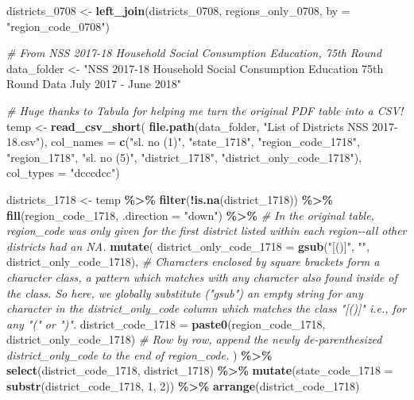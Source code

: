 \documentclass[
]{article}
\newenvironment{Shaded}{\begin{snugshade}}{\end{snugshade}}
\newcommand{\AttributeTok}[1]{\textcolor[rgb]{0.13,0.29,0.53}{#1}}
\newcommand{\CommentTok}[1]{\textcolor[rgb]{0.56,0.35,0.01}{\textit{#1}}}
\newcommand{\DecValTok}[1]{\textcolor[rgb]{0.00,0.00,0.81}{#1}}
\newcommand{\FunctionTok}[1]{\textcolor[rgb]{0.13,0.29,0.53}{\textbf{#1}}}
\newcommand{\NormalTok}[1]{#1}
\newcommand{\OtherTok}[1]{\textcolor[rgb]{0.56,0.35,0.01}{#1}}
\newcommand{\SpecialCharTok}[1]{\textcolor[rgb]{0.81,0.36,0.00}{\textbf{#1}}}
\newcommand{\StringTok}[1]{\textcolor[rgb]{0.31,0.60,0.02}{#1}}
\begin{document}
\begin{Shaded}
\begin{Highlighting}[]
\NormalTok{districts\_0708 }\OtherTok{\textless{}{-}} \FunctionTok{left\_join}\NormalTok{(districts\_0708, regions\_only\_0708, }\AttributeTok{by =} \StringTok{"region\_code\_0708"}\NormalTok{)}





\CommentTok{\# From NSS 2017{-}18 Household Social Consumption Education, 75th Round}
\NormalTok{data\_folder }\OtherTok{\textless{}{-}} \StringTok{"NSS 2017{-}18 Household Social Consumption Education 75th Round Data July 2017 {-} June 2018"}

\CommentTok{\# Huge thanks to Tabula for helping me turn the original PDF table into a CSV!}
\NormalTok{temp }\OtherTok{\textless{}{-}} \FunctionTok{read\_csv\_short}\NormalTok{(}
  \FunctionTok{file.path}\NormalTok{(data\_folder, }\StringTok{"List of Districts NSS 2017{-}18.csv"}\NormalTok{),}
  \AttributeTok{col\_names =} \FunctionTok{c}\NormalTok{(}\StringTok{"sl. no (1)"}\NormalTok{, }\StringTok{"state\_1718"}\NormalTok{, }\StringTok{"region\_code\_1718"}\NormalTok{, }\StringTok{"region\_1718"}\NormalTok{, }\StringTok{"sl. no (5)"}\NormalTok{, }\StringTok{"district\_1718"}\NormalTok{, }\StringTok{"district\_only\_code\_1718"}\NormalTok{),}
  \AttributeTok{col\_types =} \StringTok{"dcccdcc"}\NormalTok{)}

\NormalTok{districts\_1718 }\OtherTok{\textless{}{-}}\NormalTok{ temp }\SpecialCharTok{\%\textgreater{}\%} 
  \FunctionTok{filter}\NormalTok{(}\SpecialCharTok{!}\FunctionTok{is.na}\NormalTok{(district\_1718)) }\SpecialCharTok{\%\textgreater{}\%} 
  \FunctionTok{fill}\NormalTok{(region\_code\_1718, }\AttributeTok{.direction =} \StringTok{"down"}\NormalTok{) }\SpecialCharTok{\%\textgreater{}\%} \CommentTok{\# In the original table, region\_code was only given for the first district listed within each region{-}{-}all other districts had an NA.}
  \FunctionTok{mutate}\NormalTok{(}
    \AttributeTok{district\_only\_code\_1718 =} \FunctionTok{gsub}\NormalTok{(}\StringTok{"[()]"}\NormalTok{, }\StringTok{""}\NormalTok{, district\_only\_code\_1718), }\CommentTok{\# Characters enclosed by square brackets form a character class, a pattern which matches with any character also found inside of the class. So here, we globally substitute ("gsub") an empty string for any character in the district\_only\_code column which matches the class "[()]" i.e., for any "(" or ")".}
    \AttributeTok{district\_code\_1718 =} \FunctionTok{paste0}\NormalTok{(region\_code\_1718, district\_only\_code\_1718) }\CommentTok{\# Row by row, append the newly de{-}parenthesized district\_only\_code to the end of region\_code.}
\NormalTok{  ) }\SpecialCharTok{\%\textgreater{}\%} 
  \FunctionTok{select}\NormalTok{(district\_code\_1718, district\_1718) }\SpecialCharTok{\%\textgreater{}\%} 
  \FunctionTok{mutate}\NormalTok{(}\AttributeTok{state\_code\_1718 =} \FunctionTok{substr}\NormalTok{(district\_code\_1718, }\DecValTok{1}\NormalTok{, }\DecValTok{2}\NormalTok{)) }\SpecialCharTok{\%\textgreater{}\%} 
  \FunctionTok{arrange}\NormalTok{(district\_code\_1718)}


\end{Highlighting}
\end{Shaded}
\end{document}

